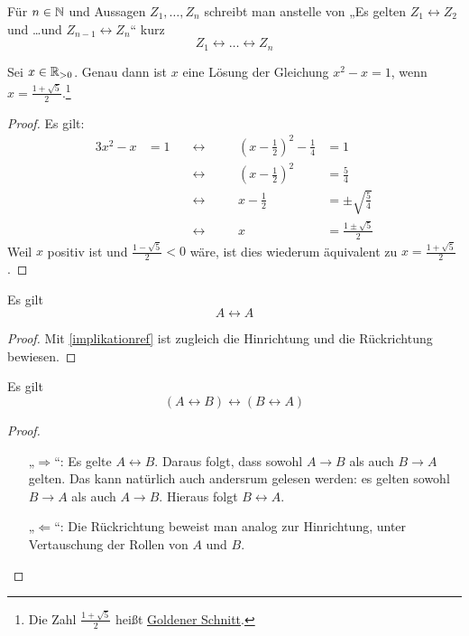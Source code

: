 \begin{nota}
    Für $n\in \mathbb N$ und Aussagen $Z_1,\dots , Z_n$ schreibt man anstelle von „Es gelten $Z_1\leftrightarrow Z_2$ und \dots und $Z_{n-1}\leftrightarrow Z_n$“ kurz
    \[ Z_1\leftrightarrow \ldots \leftrightarrow  Z_n\]
\end{nota}


\begin{bsp}
    Sei $x\in \mathbb R_{>0}$. Genau dann ist $x$ eine Lösung der Gleichung $x^2-x=1$, wenn $x= \frac{1+\sqrt{5}}{2}$.\footnote{Die Zahl $\frac{1+\sqrt{5}}{2}$ heißt \href{https://de.wikipedia.org/wiki/Goldener_Schnitt}{Goldener Schnitt}.}
\end{bsp}
\begin{proof}
    Es gilt:
    \begin{alignat*}{3}
        x^2-x& =1 \quad&\leftrightarrow\quad&& \left(x-\frac{1}{2}\right)^2 - \frac{1}{4} &= 1 \\
        && \leftrightarrow\quad&& \left(x-\frac{1}{2}\right)^2&=\frac{5}{4} \\
        && \leftrightarrow\quad&& x-\frac{1}{2} &= \pm \sqrt{\frac{5}{4}} \\
        && \leftrightarrow\quad&& x  &= \frac{1\pm \sqrt{5}}{2} 
    \end{alignat*}
    Weil $x$ positiv ist und $\frac{1-\sqrt{5}}{2}<0$ wäre, ist dies wiederum äquivalent zu $x=\frac{1+\sqrt{5}}{2}$.
\end{proof}


\begin{satz}\label{iffref}
    Es gilt
        \[ A\leftrightarrow A \]
\end{satz}
\begin{proof}
    Mit \cref{implikationref} ist zugleich die Hinrichtung und die Rückrichtung bewiesen.
\end{proof}


\begin{satz}\label{iffkomm}
    Es gilt
        \[ (A\leftrightarrow B)\leftrightarrow(B\leftrightarrow A) \]
\end{satz}
\begin{proof}
    \begin{enumerate}
        \item[„$\Rightarrow$“:] Es gelte $A\leftrightarrow B$. Daraus folgt, dass sowohl $A\to B$ als auch $B\to A$ gelten. Das kann natürlich auch andersrum gelesen werden: es gelten sowohl $B\to A$ als auch $A\to B$. Hieraus folgt $B\leftrightarrow A$.
        \item[„$\Leftarrow$“:] Die Rückrichtung beweist man analog zur Hinrichtung, unter Vertauschung der Rollen von $A$ und $B$. \qedhere
    \end{enumerate}
\end{proof}


